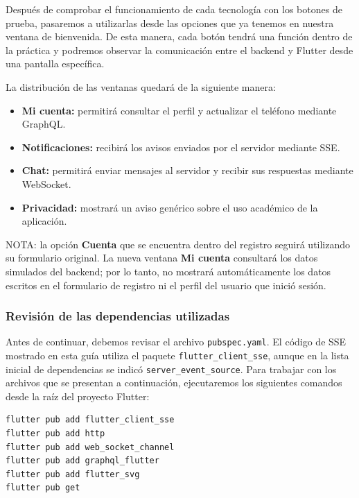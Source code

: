 
Después de comprobar el funcionamiento de cada tecnología con los botones de prueba, pasaremos a utilizarlas desde las opciones que ya tenemos en nuestra ventana de bienvenida. De esta manera, cada botón tendrá una función dentro de la práctica y podremos observar la comunicación entre el backend y Flutter desde una pantalla específica.

La distribución de las ventanas quedará de la siguiente manera:
\begin{itemize}
    \item \textbf{Mi cuenta:} permitirá consultar el perfil y actualizar el teléfono mediante GraphQL.
    \item \textbf{Notificaciones:} recibirá los avisos enviados por el servidor mediante SSE.
    \item \textbf{Chat:} permitirá enviar mensajes al servidor y recibir sus respuestas mediante WebSocket.
    \item \textbf{Privacidad:} mostrará un aviso genérico sobre el uso académico de la aplicación.
\end{itemize}

NOTA: la opción \textbf{Cuenta} que se encuentra dentro del registro seguirá utilizando su formulario original. La nueva ventana \textbf{Mi cuenta} consultará los datos simulados del backend; por lo tanto, no mostrará automáticamente los datos escritos en el formulario de registro ni el perfil del usuario que inició sesión.

\subsubsection{Revisión de las dependencias utilizadas}
Antes de continuar, debemos revisar el archivo \texttt{pubspec.yaml}. El código de SSE mostrado en esta guía utiliza el paquete \texttt{flutter\_client\_sse}, aunque en la lista inicial de dependencias se indicó \texttt{server\_event\_source}. Para trabajar con los archivos que se presentan a continuación, ejecutaremos los siguientes comandos desde la raíz del proyecto Flutter:

\begin{lstlisting}[language=bash, caption={Dependencias utilizadas en las nuevas ventanas}]
flutter pub add flutter_client_sse
flutter pub add http
flutter pub add web_socket_channel
flutter pub add graphql_flutter
flutter pub add flutter_svg
flutter pub get
\end{lstlisting}

